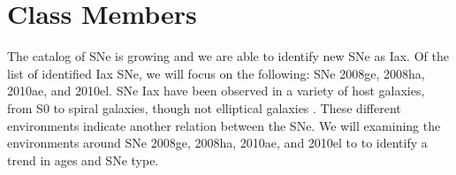 \documentclass[preprint]{aastex}
\begin{document}
\section{Class Members}
The catalog of SNe is growing and we are able to identify new SNe 
as Iax. Of the list of identified Iax SNe, we will focus on the following:  
SNe 2008ge, 2008ha, 2010ae, and 2010el. %
SNe Iax have been observed in a variety of host galaxies, from S0 to spiral galaxies, 
though not elliptical galaxies \citep{fol09}. 
These different environments indicate another relation between the SNe. 
We will examining the environments around SNe 2008ge, 2008ha, 2010ae, and 2010el to 
to identify a trend in ages and SNe type. 

\end{document}
